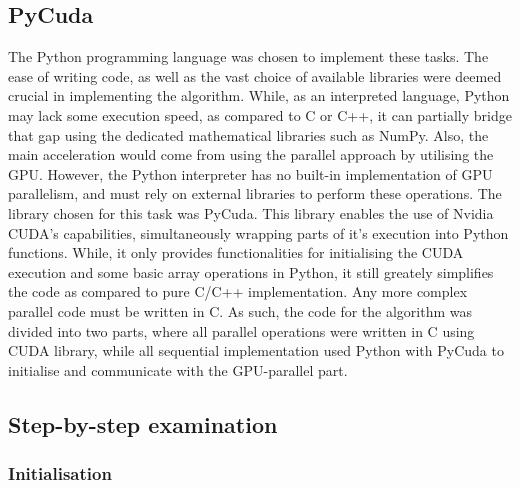\documentclass[12pt, oneside]{report}
\begin{document}
\subsection{PyCuda}

The Python programming language was chosen to implement these tasks. The ease of writing code, as well as the vast choice of available libraries were deemed crucial in implementing the algorithm. While, as an interpreted language, Python may lack some execution speed, as compared to C or C++, it can partially bridge that gap using the dedicated mathematical libraries such as NumPy. Also, the main acceleration would come from using the parallel approach by utilising the GPU.\autocite[1]{numpy} \newline
However, the Python interpreter has no built-in implementation of GPU parallelism, and must rely on external libraries to perform these operations. The library chosen for this task was PyCuda. This library enables the use of Nvidia CUDA's capabilities, simultaneously wrapping parts of it's execution into Python functions. While, it only provides functionalities for initialising the CUDA execution and some basic array operations in Python, it still greately simplifies the code as compared to pure C/C++ implementation. Any more complex parallel code must be written in C. As such, the code for the algorithm was divided into two parts, where all parallel operations were written in C using CUDA library, while all sequential implementation used Python with PyCuda to initialise and communicate with the GPU-parallel part.\autocite[1]{pycuda}


\subsection{Step-by-step examination}

\subsubsection{Initialisation}
\end{document}
